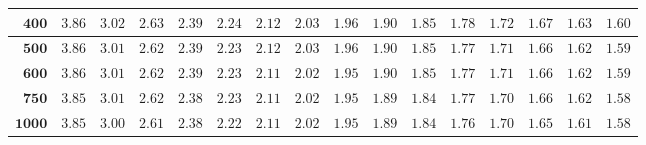 \begin{longtable}{|r|r|r|r|r|r|r|r|r|r|r|r|r|r|r|r|}
    \(\mathbf{400}\) & \(3.86\) & \(3.02\) & \(2.63\) & \(2.39\) & \(2.24\) & \(2.12\) & \(2.03\) & \(1.96\) & \(1.90\) & \(1.85\) & \(1.78\) & \(1.72\) & \(1.67\) & \(1.63\) & \(1.60\) \\ \hline
    \(\mathbf{500}\) & \(3.86\) & \(3.01\) & \(2.62\) & \(2.39\) & \(2.23\) & \(2.12\) & \(2.03\) & \(1.96\) & \(1.90\) & \(1.85\) & \(1.77\) & \(1.71\) & \(1.66\) & \(1.62\) & \(1.59\) \\ \hline
    \(\mathbf{600}\) & \(3.86\) & \(3.01\) & \(2.62\) & \(2.39\) & \(2.23\) & \(2.11\) & \(2.02\) & \(1.95\) & \(1.90\) & \(1.85\) & \(1.77\) & \(1.71\) & \(1.66\) & \(1.62\) & \(1.59\) \\ \hline
    \(\mathbf{750}\) & \(3.85\) & \(3.01\) & \(2.62\) & \(2.38\) & \(2.23\) & \(2.11\) & \(2.02\) & \(1.95\) & \(1.89\) & \(1.84\) & \(1.77\) & \(1.70\) & \(1.66\) & \(1.62\) & \(1.58\) \\ \hline
    \(\mathbf{1000}\) & \(3.85\) & \(3.00\) & \(2.61\) & \(2.38\) & \(2.22\) & \(2.11\) & \(2.02\) & \(1.95\) & \(1.89\) & \(1.84\) & \(1.76\) & \(1.70\) & \(1.65\) & \(1.61\) & \(1.58\) \\ \hline


\end{longtable}
\changefontsizes{11pt}
\newpage

